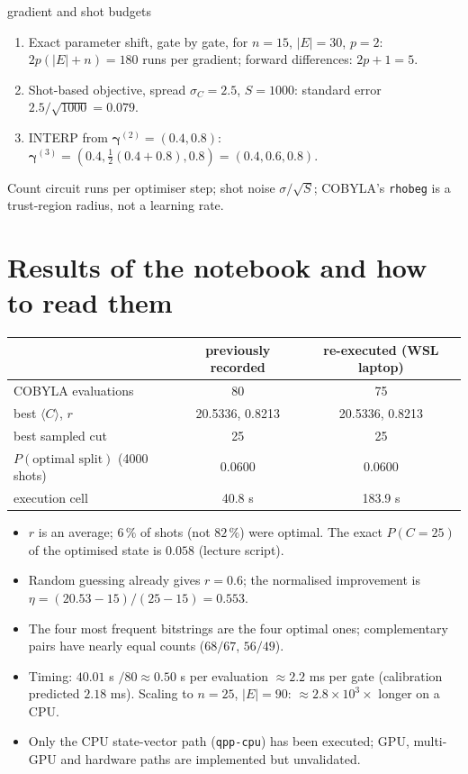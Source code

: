\documentclass[11pt,a4paper,openany]{book}
\newcounter{wex}[chapter]
\newenvironment{steps}{\begin{enumerate}[label=\textbf{Step \arabic*.}, leftmargin=4.2em, itemsep=2pt]}{\end{enumerate}}
\newcommand{\bg}{\boldsymbol\gamma}
\begin{document}
\begin{wexample}{gradient and shot budgets}
\begin{steps}
\item Exact parameter shift, gate by gate, for $n = 15$, $|E| = 30$, $p = 2$: $2p(|E| + n) = 180$ runs per gradient; forward differences: $2p + 1 = 5$.
\item Shot-based objective, spread $\sigma_C = 2.5$, $S = 1000$: standard error $2.5/\sqrt{1000} = 0.079$.
\item INTERP from $\bg^{(2)} = (0.4, 0.8)$: $\bg^{(3)} = (0.4, \frac12(0.4 + 0.8), 0.8) = (0.4, 0.6, 0.8)$.
\end{steps}
\end{wexample}
\begin{checklist}
Count circuit runs per optimiser step; shot noise $\sigma/\sqrt S$; COBYLA's \texttt{rhobeg} is a trust-region radius, not a learning rate.
\end{checklist}

\section{Results of the notebook and how to read them}
\begin{center}\small
\begin{tabular}{lcc}
\toprule & previously recorded & re-executed (WSL laptop)\\ \midrule
COBYLA evaluations & 80 & 75\\
best $\langle C\rangle$, $r$ & 20.5336, 0.8213 & 20.5336, 0.8213\\
best sampled cut & 25 & 25\\
$P(\text{optimal split})$ (4000 shots) & 0.0600 & 0.0600\\
execution cell & 40.8 s & 183.9 s\\ \bottomrule
\end{tabular}
\end{center}
\begin{itemize}
\item $r$ is an average; $6\,\%$ of shots (not $82\,\%$) were optimal. The exact $P(C = 25)$ of the optimised state is $0.058$ (lecture script).
\item Random guessing already gives $r = 0.6$; the normalised improvement is $\eta = (20.53 - 15)/(25 - 15) = 0.553$.
\item The four most frequent bitstrings are the four optimal ones; complementary pairs have nearly equal counts ($68/67$, $56/49$).
\item Timing: $40.01$ s $/80 \approx 0.50$ s per evaluation $\approx 2.2$ ms per gate (calibration predicted $2.18$ ms). Scaling to $n = 25$,
$|E| = 90$: $\approx 2.8\times10^3\times$ longer on a CPU.
\item Only the CPU state-vector path (\texttt{qpp-cpu}) has been executed; GPU, multi-GPU and hardware paths are implemented but unvalidated.
\end{itemize}
\end{document}
